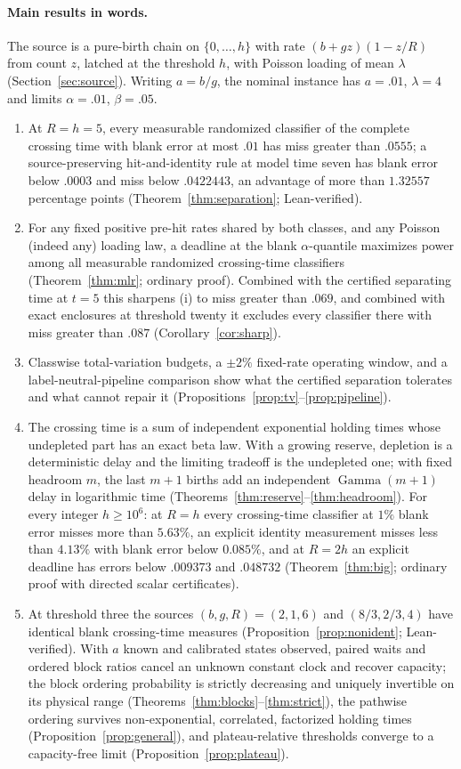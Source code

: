 \documentclass[11pt,a4paper]{article}
\theoremstyle{plain}
\theoremstyle{definition}
\theoremstyle{remark}
\newcommand{\Gam}{\operatorname{Gamma}}
\begin{document}
\paragraph{Main results in words.}
The source is a pure-birth chain on $\{0,\dots,h\}$ with rate $(b+gz)(1-z/R)$ from count $z$, latched at the threshold $h$, with Poisson loading of mean $\lambda$ (Section~\ref{sec:source}). Writing $a=b/g$, the nominal instance has $a=.01$, $\lambda=4$ and limits $\alpha=.01$, $\beta=.05$.
\begin{enumerate}[label=(\roman*)]
\item At $R=h=5$, every measurable randomized classifier of the complete crossing time with blank error at most $.01$ has miss greater than $.0555$; a source-preserving hit-and-identity rule at model time seven has blank error below $.0003$ and miss below $.0422443$, an advantage of more than $1.32557$ percentage points (Theorem~\ref{thm:separation}; Lean-verified).
\item For any fixed positive pre-hit rates shared by both classes, and any Poisson (indeed any) loading law, a deadline at the blank $\alpha$-quantile maximizes power among all measurable randomized crossing-time classifiers (Theorem~\ref{thm:mlr}; ordinary proof). Combined with the certified separating time at $t=5$ this sharpens (i) to miss greater than $.069$, and combined with exact enclosures at threshold twenty it excludes every classifier there with miss greater than $.087$ (Corollary~\ref{cor:sharp}).
\item Classwise total-variation budgets, a $\pm2\%$ fixed-rate operating window, and a label-neutral-pipeline comparison show what the certified separation tolerates and what cannot repair it (Propositions~\ref{prop:tv}--\ref{prop:pipeline}).
\item The crossing time is a sum of independent exponential holding times whose undepleted part has an exact beta law. With a growing reserve, depletion is a deterministic delay and the limiting tradeoff is the undepleted one; with fixed headroom $m$, the last $m+1$ births add an independent $\Gam(m+1)$ delay in logarithmic time (Theorems~\ref{thm:reserve}--\ref{thm:headroom}). For every integer $h\ge10^{6}$: at $R=h$ every crossing-time classifier at $1\%$ blank error misses more than $5.63\%$, an explicit identity measurement misses less than $4.13\%$ with blank error below $0.085\%$, and at $R=2h$ an explicit deadline has errors below $.009373$ and $.048732$ (Theorem~\ref{thm:big}; ordinary proof with directed scalar certificates).
\item At threshold three the sources $(b,g,R)=(2,1,6)$ and $(8/3,2/3,4)$ have identical blank crossing-time measures (Proposition~\ref{prop:nonident}; Lean-verified). With $a$ known and calibrated states observed, paired waits and ordered block ratios cancel an unknown constant clock and recover capacity; the block ordering probability is strictly decreasing and uniquely invertible on its physical range (Theorems~\ref{thm:blocks}--\ref{thm:strict}), the pathwise ordering survives non-exponential, correlated, factorized holding times (Proposition~\ref{prop:general}), and plateau-relative thresholds converge to a capacity-free limit (Proposition~\ref{prop:plateau}).

\end{enumerate}
\end{document}
